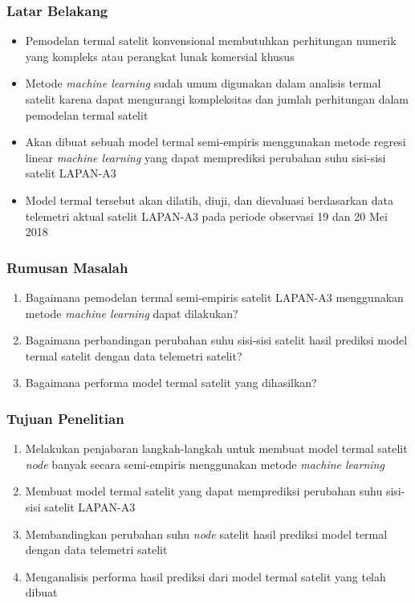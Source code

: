 \documentclass[8pt]{beamer}
\begin{document}
\begin{frame}
  \frametitle{Latar Belakang}
    \begin{itemize}
      \item Pemodelan termal satelit konvensional membutuhkan perhitungan numerik yang kompleks \cite{das} atau perangkat lunak komersial khusus \cite{boudjemai2015}
      \item Metode \textit{machine learning} sudah umum digunakan dalam analisis termal satelit karena dapat mengurangi kompleksitas dan jumlah perhitungan dalam pemodelan termal satelit \cite{junior2017}\cite{escobar2016}\cite{xiong2020}
      \item Akan dibuat sebuah model termal semi-empiris menggunakan metode regresi linear \textit{machine learning} yang dapat memprediksi perubahan suhu sisi-sisi satelit LAPAN-A3
      \item Model termal tersebut akan dilatih, diuji, dan dievaluasi berdasarkan data telemetri aktual satelit LAPAN-A3 pada periode observasi 19 dan 20 Mei 2018
    \end{itemize}
\end{frame}


\begin{frame}
  \frametitle{Rumusan Masalah}
  \begin{enumerate}
    \item Bagaimana pemodelan termal semi-empiris satelit LAPAN-A3 menggunakan metode \textit{machine learning} dapat dilakukan?
    \item Bagaimana perbandingan perubahan suhu sisi-sisi satelit hasil prediksi model termal satelit dengan data telemetri satelit?
    \item Bagaimana performa model termal satelit yang dihasilkan?
  \end{enumerate}
\end{frame}

\begin{frame}
  \frametitle{Tujuan Penelitian}
  \begin{enumerate}
    \item Melakukan penjabaran langkah-langkah untuk membuat model termal satelit \textit{node} banyak secara semi-empiris menggunakan metode \textit{machine learning}
    \item Membuat model termal satelit yang dapat memprediksi perubahan suhu sisi-sisi satelit LAPAN-A3
    \item Membandingkan perubahan suhu \textit{node} satelit hasil prediksi model termal dengan data telemetri satelit
    \item Menganalisis performa hasil prediksi dari model termal satelit yang telah dibuat
\end{enumerate}

\end{frame}
\end{document}
